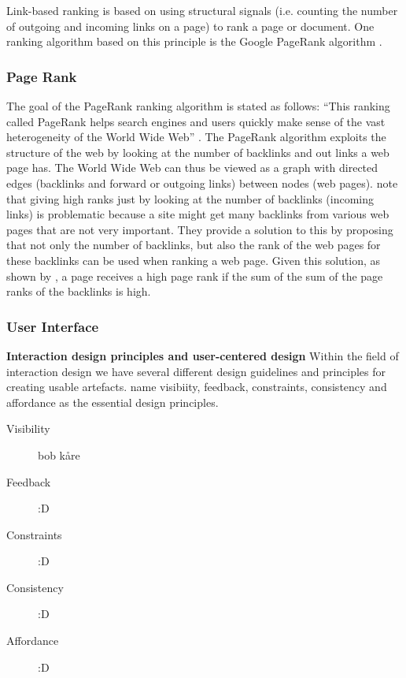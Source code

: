 Link-based ranking is based on using structural signals (i.e. counting the number of outgoing and incoming links on a page) to rank a page or document. One ranking algorithm based on this  principle is the Google PageRank algorithm \citep{Page1999}.

\subsubsection{Page Rank}
The goal of the PageRank ranking algorithm is stated as follows: “This ranking called PageRank helps search engines and users quickly make sense of the vast heterogeneity of the World Wide Web” \citep[p. 1]{Page1999}. The PageRank algorithm exploits the structure of the web by looking at the number of backlinks and out links a web page has. The World Wide Web can thus be viewed as a graph with directed edges (backlinks and forward or outgoing links) between nodes (web pages). \citet{Page1999} note that giving high ranks just by looking at the number of backlinks (incoming links) is problematic because a site might get many backlinks from various web pages that are not very important. They provide a solution to this by proposing that not only the number of backlinks, but also the rank of the web pages for these backlinks can be used when ranking a web page. Given this solution, as shown by \citet{Page1999}, a page receives a high page rank if the sum of the sum of the page ranks of the backlinks is high.


\subsubsection{User Interface}

{\bf Interaction design principles and user-centered design}\newline
Within the field of interaction design we have several different design guidelines and principles for creating usable artefacts. \citet{Sharp2007} name visibiity, feedback, constraints, consistency and affordance as the essential design principles.

\begin{description}
  \item[Visibility] bob kåre
  \item[Feedback]  :D
  \item[Constraints] :D
  \item[Consistency] :D
  \item[Affordance] :D
\end{description}

